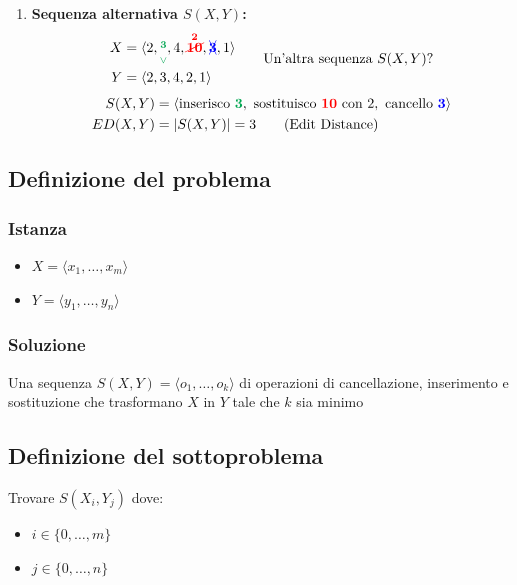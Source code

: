 \begin{enumerate}
    \item \textbf{Sequenza alternativa $S(X, Y)$:}
    \[
    \begin{aligned}
    X &= \langle 2, \overset{\textcolor{slidegreen}{\mathbf{3}}}{\underset{\textcolor{slidegreen}{\vee}}{\phantom{,}}}, 4, \overset{\textcolor{red}{\mathbf{2}}}{\textcolor{red}{\cancel{\mathbf{10}}}}, \textcolor{blue}{\xcancel{\mathbf{3}}}, 1 \rangle \\
    Y &= \langle 2, 3, 4, 2, 1 \rangle
    \end{aligned}
    \qquad \text{Un'altra sequenza } S(X, Y)\text{?}
    \]
    \begin{align*}
    S(X, Y) &= \langle \text{inserisco } \textcolor{slidegreen}{\mathbf{3}}, \text{ sostituisco } \textcolor{red}{\mathbf{10}} \text{ con } 2, \text{ cancello } \textcolor{blue}{\mathbf{3}} \rangle \\
    ED(X, Y) &= |S(X, Y)| = 3 \qquad (\text{Edit Distance})
    \end{align*}
\end{enumerate}

\subsection{Definizione del problema}
\subsubsection{Istanza}
\begin{itemize}
    \item $X = \langle x_1, \dots, x_m \rangle$ 
    \item $Y = \langle y_1, \dots, y_n \rangle$
\end{itemize}

\subsubsection{Soluzione}
Una sequenza $S(X,Y) = \langle o_1, \dots, o_k \rangle$ di operazioni di cancellazione, inserimento e sostituzione che trasformano $X$ in $Y$ tale che $k$ sia minimo

\subsection{Definizione del sottoproblema}
Trovare $S(X_i,Y_j)$ dove:
\begin{itemize}
    \item $i \in \{0, \dots, m\}$
    \item $j \in \{0, \dots, n\}$
\end{itemize}

